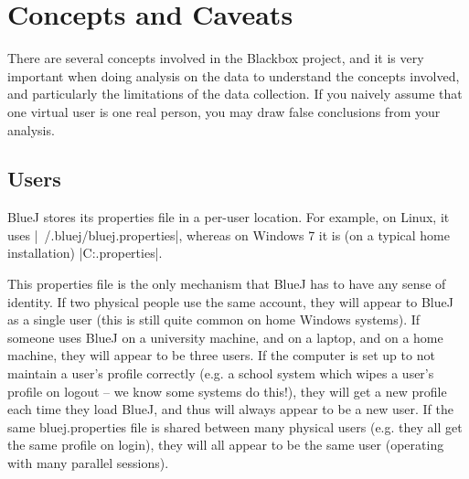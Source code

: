 \documentclass{report}
\begin{document}
\begingroup
\let\clearpage\relax
\tableofcontents
\endgroup

\listoftables

\begin{table}
\caption[Possible \lstinline!master_events.name! values]{List of different
  values allowed for the \lstinline!name! column in the \lstinline!master_events! column, with
  links to sections in which that event is described.}
\label{tab:event_names}
\begin{center}
\end{center}
\end{table}

\chapter{Concepts and Caveats}
\label{sec:concepts}

There are several concepts involved in the Blackbox project, and it is
very important when doing analysis on the data to understand the concepts
involved, and particularly the limitations of the data collection.  If you
naively assume that one virtual user is one real person, you may draw false
conclusions from your analysis.

\section{Users}
\label{def:users}

BlueJ stores its properties file in a per-user location.  For example, on
Linux, it uses |~/.bluej/bluej.properties|, whereas on Windows 7 it is (on a typical
home installation) |C:\Users\Joe\bluej\bluej.properties|.

This properties file is the only mechanism that BlueJ has to have any sense of
identity.  If two physical people use the same account, they will appear to
BlueJ as a single user (this is still quite common on home Windows systems).
If someone uses BlueJ on a university machine, and on a laptop, and on a home
machine, they will appear to be three users.
If the computer is set up to not maintain a user's profile correctly (e.g. a
school system which wipes a user's profile on logout -- we know some systems
do this!), they will get a new profile each time they load BlueJ, and thus
will always appear to be a new user.  If the same bluej.properties file is
shared between many physical users (e.g. they all get the same profile on
login), they will all appear to be the same user (operating with many parallel sessions).
\end{document}
